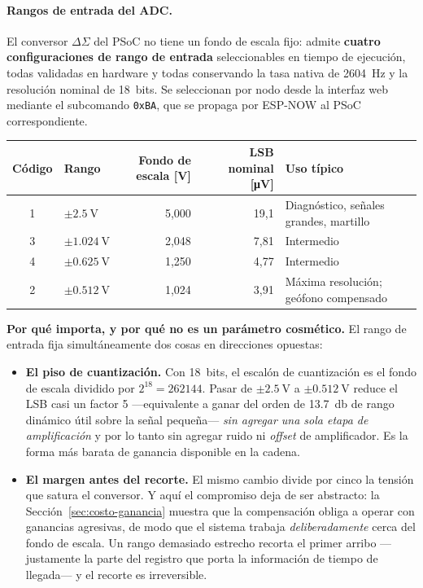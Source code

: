 \paragraph{Rangos de entrada del ADC.} El conversor $\Delta\Sigma$ del PSoC no tiene un
fondo de escala fijo: admite \textbf{cuatro configuraciones de rango de entrada}
seleccionables en tiempo de ejecuci\'on, todas validadas en hardware y todas conservando
la tasa nativa de \SI{2604}{\hertz} y la resoluci\'on nominal de 18~bits. Se seleccionan
por nodo desde la interfaz web mediante el subcomando \texttt{0xBA}, que se propaga por
ESP-NOW al PSoC correspondiente.

\begin{center}\footnotesize
\begin{tabular}{@{}clrrl@{}}
\toprule
C\'odigo & Rango & Fondo de escala [\si{\volt}] & LSB nominal [\si{\micro\volt}] & Uso t\'ipico \\
\midrule
1 & $\pm\SI{2.5}{\volt}$    & 5{,}000 & 19{,}1 & Diagn\'ostico, se\~nales grandes, martillo \\
3 & $\pm\SI{1.024}{\volt}$  & 2{,}048 & 7{,}81 & Intermedio \\
4 & $\pm\SI{0.625}{\volt}$  & 1{,}250 & 4{,}77 & Intermedio \\
2 & $\pm\SI{0.512}{\volt}$  & 1{,}024 & 3{,}91 & M\'axima resoluci\'on; ge\'ofono compensado \\
\bottomrule
\end{tabular}
\end{center}

\textbf{Por qu\'e importa, y por qu\'e no es un par\'ametro cosm\'etico.} El rango de
entrada fija simult\'aneamente dos cosas en direcciones opuestas:

\begin{itemize}[itemsep=0.2em]
    \item \textbf{El piso de cuantizaci\'on.} Con 18~bits, el escal\'on de cuantizaci\'on
    es el fondo de escala dividido por $2^{18}=\num{262144}$. Pasar de
    $\pm\SI{2.5}{\volt}$ a $\pm\SI{0.512}{\volt}$ reduce el LSB casi un factor 5
    ---equivalente a ganar del orden de \SI{13.7}{\decibel} de rango din\'amico \'util
    sobre la se\~nal peque\~na--- \emph{sin agregar una sola etapa de amplificaci\'on} y
    por lo tanto sin agregar ruido ni \emph{offset} de amplificador. Es la forma m\'as
    barata de ganancia disponible en la cadena.
    \item \textbf{El margen antes del recorte.} El mismo cambio divide por cinco la
    tensi\'on que satura el conversor. Y aqu\'i el compromiso deja de ser abstracto: la
    Secci\'on~\ref{sec:costo-ganancia} muestra que la compensaci\'on obliga a operar con
    ganancias agresivas, de modo que el sistema trabaja \emph{deliberadamente} cerca del
    fondo de escala. Un rango demasiado estrecho recorta el primer arribo ---justamente
    la parte del registro que porta la informaci\'on de tiempo de llegada--- y el recorte
    es irreversible.
\end{itemize}

